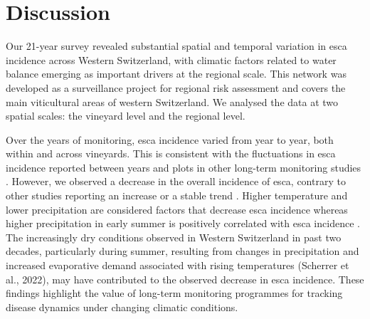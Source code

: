\section{Discussion}\label{sec:discussion}

Our 21-year survey revealed substantial spatial and temporal variation in esca incidence across Western Switzerland, with climatic factors related to water balance emerging as important drivers at the regional scale. This network was developed as a surveillance project for regional risk assessment and covers the main viticultural areas of western Switzerland. We analysed the data at two spatial scales: the vineyard level and the regional level.

Over the years of monitoring, esca incidence varied from year to year, both within and across vineyards. This is consistent with the fluctuations in esca incidence reported between years and plots in other long-term monitoring studies \citep{dewasme_long-term_2022,etienne_exploring_2024,etienne_identification_2026}. However, we observed a decrease in the overall incidence of esca, contrary to other studies reporting an increase \citep{bruez_overview_2012} or a stable trend \citep{etienne_exploring_2024}. Higher temperature and lower precipitation are considered factors that decrease esca incidence \citep{bortolami_grapevines_2021,etienne_exploring_2024} whereas higher precipitation in early summer is positively correlated with esca incidence \citep{calzarano_rainfall_2018,serra_expression_2018}. \citep{scherrer_trends_2022} The increasingly dry conditions observed in Western Switzerland in past two decades, particularly during summer, resulting from changes in precipitation and increased evaporative demand associated with rising temperatures (Scherrer et al., 2022), may have contributed to the observed decrease in esca incidence. These findings highlight the value of long-term monitoring programmes for tracking disease dynamics under changing climatic conditions.

